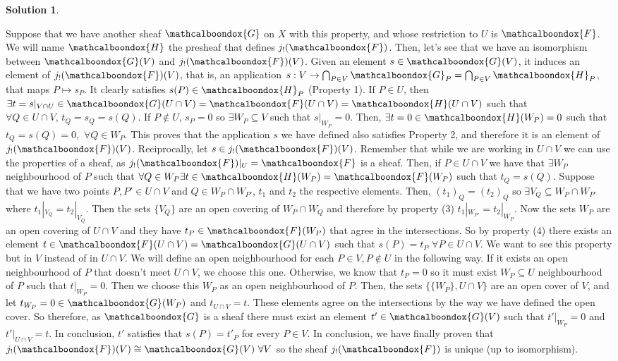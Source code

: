 \documentclass[12pt]{article}
\theoremstyle{definition}
\newtheorem*{sol}{Solution}
\newcommand{\sF}{\ensuremath{\mathcalboondox{F}}}
\newcommand{\sG}{\ensuremath{\mathcalboondox{G}}}
\newcommand{\sH}{\ensuremath{\mathcalboondox{H}}}
\begin{document}
\begin{sol}
\begin{enumerate}[label=\alph*)]
		Suppose that we have another sheaf $\sG$ on $X$ with this property, and whose restriction to $U$ is $\sF$. We will name $\sH$ the presheaf that defines $j_{!}(\sF)$. Then, let's see that we have an isomorphism between $\sG(V)$ and $j_{!}(\sF)(V)$. Given an element $s \in \sG(V)$, it induces an element of $j_{!}(\sF)(V)$, that is, an application $s: V \to \bigcap_{P \in V} \sG_P = \bigcap_{P \in V} \sH_P$, that maps $P \mapsto s_P$. It clearly satisfies $s(P) \in \sH_P$ (Property 1). If $P \in U$, then $\exists t = s|_{V \cap U} \in \sG(U \cap V) = \sF(U \cap V) = \sH(U \cap V)$ such that $\forall Q \in U \cap V, \, t_Q = s_Q = s(Q)$. If $P \notin U$, $s_P = 0$ so $\exists W_P \subseteq V$ such that $s|_{W_P} = 0$. Then, $\exists t = 0 \in \sH(W_P) = 0$ such that $t_Q = s(Q) = 0, \, \, \forall Q \in W_P$. This proves that the application $s$ we have defined also satisfies Property 2, and therefore it is an element of $j_{!}(\sF)(V)$. Reciprocally, let $s \in j_{!}(\sF)(V)$. Remember that while we are working in $U \cap V$ we can use the properties of a sheaf, as $j_{!}(\sF)|_U = \sF$ is a sheaf.  Then, if $P \in U \cap V$ we have that $\exists W_P$ neighbourhood of $P$ such that $\forall Q \in W_P \exists t \in \sH(W_P) = \sF(W_P)$ such that $t_Q = s(Q)$. Suppose that we have two points $P, P' \in U \cap V$ and $Q \in W_P \cap W_{P'}$, $t_1$ and $t_2$ the respective elements. Then, $(t_1)_Q = (t_2)_Q$ so $\exists V_{Q} \subseteq W_P \cap W_{P'}$ where $t_1|_{V_Q} = t_2|_{V_Q}$. Then the sets $\{V_Q\}$ are an open covering of $W_P \cap W_Q$ and therefore by property (3) $t_1|_{W_{P'}} = t_2|_{W_P}$. Now the sets $W_P$ are an open covering of $U \cap V$ and they have $t_P \in \sF(W_P)$ that agree in the intersections. So by property (4) there exists an element $t \in \sF(U \cap V) = \sG(U \cap V)$ such that $s(P) = t_P \, \, \forall P \in U \cap V$. We want to see this property but in $V$ instead of in $U \cap V$. We will define an open neighbourhood for each $P \in V, P \notin U$ in the following way. If it exists an open neighbourhood of $P$ that doesn't meet $U \cap V$, we choose this one. Otherwise, we know that $t_P = 0$ so it must exist $W_P \subseteq U$ neighbourhood of $P$ such that $t|_{W_P} = 0$. Then we choose this $W_P$ as an open neighbourhood of $P$. Then, the sets $\{\{W_P\}, U \cap V\}$ are an open cover of $V$, and let $t_{W_P} = 0 \in \sG(W_P)$ and $t_{U \cap V} = t$. These elements agree on the intersections by the way we have defined the open cover. So therefore, as $\sG$ is a sheaf there must exist an element $t' \in \sG(V)$ such that $t'|_{W_P} = 0$ and $t'|_{U \cap V} = t$. In conclusion, $t'$ satisfies that $s(P) = t'_{P}$ for every $P \in V$. In conclusion, we have finally proven that $j_{!}(\sF)(V) \cong \sG(V) \, \, \forall V$ so the sheaf $j_{!}(\sF)$ is unique (up to isomorphism).


\end{enumerate}
\end{sol}
\end{document}
